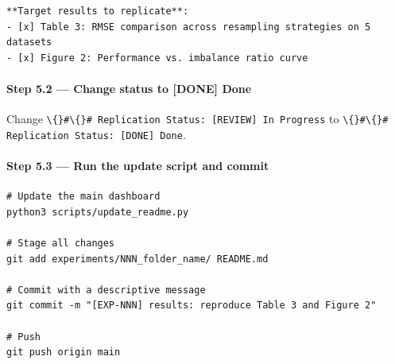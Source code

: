 \begin{verbatim}
**Target results to replicate**:
- [x] Table 3: RMSE comparison across resampling strategies on 5 datasets
- [x] Figure 2: Performance vs. imbalance ratio curve
\end{verbatim}

\paragraph{Step 5.2 --- Change status to {[}DONE{]}
Done}\label{step-5.2-change-status-to-done-done}

Change
\texttt{\textbackslash\{\}\#\textbackslash\{\}\# Replication Status: [REVIEW] In Progress}
to \texttt{\textbackslash\{\}\#\textbackslash\{\}\# Replication Status: [DONE] Done}.

\paragraph{Step 5.3 --- Run the update script and
commit}\label{step-5.3-run-the-update-script-and-commit}

\begin{verbatim}
# Update the main dashboard
python3 scripts/update_readme.py

# Stage all changes
git add experiments/NNN_folder_name/ README.md

# Commit with a descriptive message
git commit -m "[EXP-NNN] results: reproduce Table 3 and Figure 2"

# Push
git push origin main
\end{verbatim}
